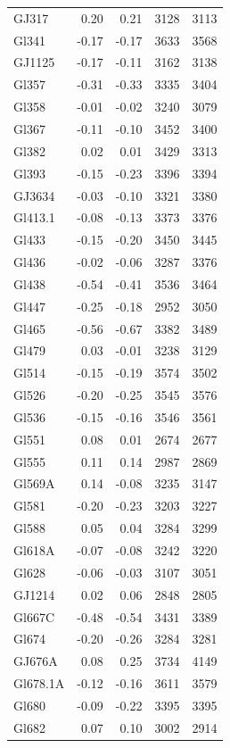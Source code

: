 \documentclass{aa}
\begin{document}
\begin{table}[h!]
{\begin{tabular}{ l r r r r}
GJ317 & 0.20 & 0.21 & 3128 & 3113 \\
Gl341 & -0.17 & -0.17 & 3633 & 3568 \\
GJ1125 & -0.17 & -0.11 & 3162 & 3138 \\
Gl357 & -0.31 & -0.33 & 3335 & 3404 \\
Gl358 & -0.01 & -0.02 & 3240 & 3079 \\
Gl367 & -0.11 & -0.10 & 3452 & 3400 \\
Gl382 & 0.02 & 0.01 & 3429 & 3313 \\
Gl393 & -0.15 & -0.23 & 3396 & 3394 \\
GJ3634 & -0.03 & -0.10 & 3321 & 3380 \\
Gl413.1 & -0.08 & -0.13 & 3373 & 3376 \\
Gl433 & -0.15 & -0.20 & 3450 & 3445 \\
Gl436 & -0.02 & -0.06 & 3287 & 3376 \\
Gl438 & -0.54 & -0.41 & 3536 & 3464 \\
Gl447 & -0.25 & -0.18 & 2952 & 3050 \\
Gl465 & -0.56 & -0.67 & 3382 & 3489 \\
Gl479 & 0.03 & -0.01 & 3238 & 3129 \\
Gl514 & -0.15 & -0.19 & 3574 & 3502 \\
Gl526 & -0.20 & -0.25 & 3545 & 3576 \\
Gl536 & -0.15 & -0.16 & 3546 & 3561 \\
Gl551 & 0.08 & 0.01 & 2674 & 2677 \\
Gl555 & 0.11 & 0.14 & 2987 & 2869 \\
Gl569A & 0.14 & -0.08 & 3235 & 3147 \\
Gl581 & -0.20 & -0.23 & 3203 & 3227 \\
Gl588 & 0.05 & 0.04 & 3284 & 3299 \\
Gl618A & -0.07 & -0.08 & 3242 & 3220 \\
Gl628 & -0.06 & -0.03 & 3107 & 3051 \\
GJ1214 & 0.02 & 0.06 & 2848 & 2805 \\
Gl667C & -0.48 & -0.54 & 3431 & 3389 \\
Gl674 & -0.20 & -0.26 & 3284 & 3281 \\
GJ676A & 0.08 & 0.25 & 3734 & 4149 \\
Gl678.1A & -0.12 & -0.16 & 3611 & 3579 \\
Gl680 & -0.09 & -0.22 & 3395 & 3395 \\
Gl682 & 0.07 & 0.10 & 3002 & 2914 \\

\end{tabular}}
\end{table}
\end{document}
